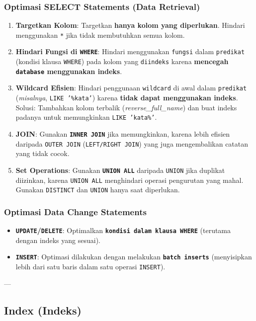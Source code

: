 \documentclass{article}
\begin{document}
\subsubsection{Optimasi SELECT Statements (Data Retrieval)}
\begin{enumerate}
    \item \textbf{Targetkan Kolom}: Targetkan \textbf{hanya kolom yang diperlukan}. Hindari menggunakan \texttt{*} jika tidak membutuhkan semua kolom.
    \item \textbf{Hindari Fungsi di \texttt{WHERE}}: Hindari menggunakan \texttt{fungsi} dalam \texttt{predikat} (kondisi klausa \texttt{WHERE}) pada kolom yang \texttt{diindeks} karena \textbf{mencegah \texttt{database} menggunakan indeks}.
    \item \textbf{Wildcard Efisien}: Hindari penggunaan \texttt{wildcard} di awal dalam \texttt{predikat} (\textit{misalnya}, \texttt{LIKE '\%kata'}) karena \textbf{tidak dapat menggunakan indeks}. Solusi: Tambahkan kolom terbalik (\textit{reverse\_full\_name}) dan buat indeks padanya untuk memungkinkan \texttt{LIKE 'kata\%'}.
    \item \textbf{JOIN}: Gunakan \textbf{\texttt{INNER JOIN}} jika memungkinkan, karena lebih efisien daripada \texttt{OUTER JOIN} (\texttt{LEFT/RIGHT JOIN}) yang juga mengembalikan catatan yang tidak cocok.
    \item \textbf{Set Operations}: Gunakan \textbf{\texttt{UNION ALL}} daripada \texttt{UNION} jika duplikat diizinkan, karena \texttt{UNION ALL} menghindari operasi pengurutan yang mahal. Gunakan \texttt{DISTINCT} dan \texttt{UNION} hanya saat diperlukan.
\end{enumerate}

\subsubsection{Optimasi Data Change Statements}
\begin{itemize}
    \item \textbf{\texttt{UPDATE}/\texttt{DELETE}}: Optimalkan \textbf{\texttt{kondisi dalam klausa WHERE}} (terutama dengan indeks yang sesuai).
    \item \textbf{\texttt{INSERT}}: Optimasi dilakukan dengan melakukan \textbf{\texttt{batch inserts}} (menyisipkan lebih dari satu baris dalam satu operasi \texttt{INSERT}).
\end{itemize}

---

\subsection{Index (Indeks)}
\end{document}
